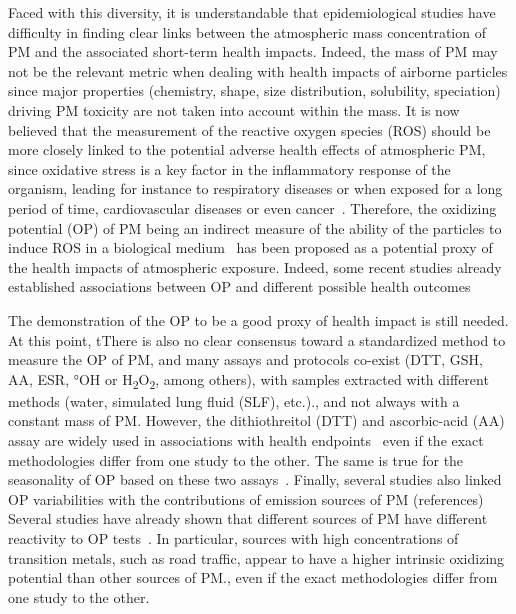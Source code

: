 \documentclass[acp]{copernicus}
\begin{document}
Faced with this diversity, it is understandable that epidemiological
studies have difficulty in finding clear links between the atmospheric
mass concentration of PM and the associated short-term health impacts.
Indeed, the mass of PM may not be the relevant metric when dealing with
health impacts of airborne particles since major properties (chemistry,
shape, size distribution, solubility, speciation) driving PM toxicity
are not taken into account within the mass. It is now believed that the
measurement of the reactive oxygen species (ROS) should be more closely
linked to the potential adverse health effects of atmospheric PM, since
oxidative stress is a key factor in the inflammatory response of the
organism, leading for instance to respiratory diseases or when exposed
for a long period of time, cardiovascular diseases or even
cancer~\citep{lelieveldContribution2015,liParticulate2003a}. Therefore, the
oxidizing potential (OP) of PM being an indirect measure of the ability
of the particles to induce ROS in a biological
medium~\citep{ayresEvaluating2008,choRedox2005,liOxidant2009,sauvainNanoparticle2008}
has been proposed as a potential proxy of the health impacts of atmospheric
exposure. Indeed, some recent studies already established associations
between OP and different possible health
outcomes~\citep{costabileEvidence2019,karavalakisImpact2017,steenhofVitro2011,strakAssociations2017,tuetChemical2017,weichenthalFine2016,weichenthalOxidative2016}

The demonstration of the OP to be a good proxy of health impact is still
needed. At this point, tThere is also no clear consensus toward a
standardized method to measure the OP of PM, and many assays and
protocols co-exist (DTT, GSH, AA, ESR, °OH or
H\textsubscript{2}O\textsubscript{2}, among others), with samples
extracted with different methods (water, simulated lung fluid (SLF),
etc.)., and not always with a constant mass of PM. However, the
dithiothreitol (DTT) and ascorbic-acid (AA) assay are widely used in
associations with health
endpoints~\citep{abramsAssociations2017,atkinsonShortterm2016,batesReactive2015,canovaPM102014,fangOxidative2016,janssenAssociations2015,strakLongterm2017,weichenthalOxidative2016,yangChildren2016,zhangAssociations2016}
even if the exact methodologies
differ from one study to the other. The same is true for the seasonality
of OP based on these two
assays~\citep{batesReactive2015,calasSeasonal2019,cesariSource2019,fangOxidative2016,maSources2018,paraskevopoulouYearlong2019,perronePM2016,pietrograndeChemical2018,vermaReactive2014,vermaOrganic2015,weberApportionment2018,zhouPredominance2019}.
Finally, several studies also linked OP variabilities with the contributions of
emission sources of PM (references) Several studies have already shown
that different sources of PM have different reactivity to OP
tests~\citep{batesReactive2015,cesariSource2019,fangOxidative2016,paraskevopoulouYearlong2019,vermaReactive2014,weberApportionment2018,zhouPredominance2019}. In particular, sources with high concentrations of
transition metals, such as road traffic, appear to have a higher
intrinsic oxidizing potential than other sources of PM., even if the
exact methodologies differ from one study to the other.
\end{document}
